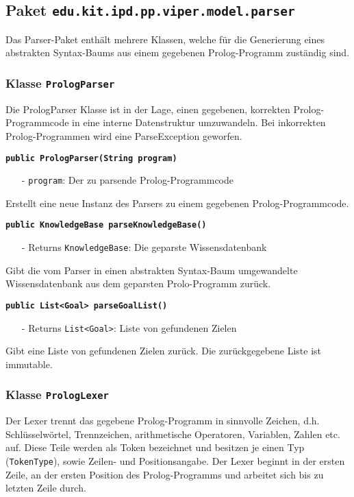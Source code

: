 \documentclass[parskip=full,11pt,twoside]{scrartcl}
\begin{document}
\newpage
\subsection{Paket \texttt{edu.kit.ipd.pp.viper.model.parser}}

Das Parser-Paket enthält mehrere Klassen, welche für die Generierung eines abstrakten Syntax-Baums aus einem gegebenen Prolog-Programm zuständig sind.

\subsubsection{Klasse \texttt{PrologParser}}

Die PrologParser Klasse ist in der Lage, einen gegebenen, korrekten Prolog-Programmcode in eine interne Datenstruktur umzuwandeln. Bei inkorrekten Prolog-Programmen wird eine ParseException geworfen.

\textbf{\texttt{public PrologParser(String program)}}
\begin{itemize}[noitemsep]
	\item[-] \texttt{program}: Der zu parsende Prolog-Programmcode
\end{itemize}
Erstellt eine neue Instanz des Parsers zu einem gegebenen Prolog-Programmcode.

\textbf{\texttt{public KnowledgeBase parseKnowledgeBase()}}
\begin{itemize}[noitemsep]
	\item[-] Returns \texttt{KnowledgeBase}: Die geparste Wissensdatenbank
\end{itemize}
Gibt die vom Parser in einen abstrakten Syntax-Baum umgewandelte Wissensdatenbank aus dem geparsten Prolo-Programm zurück.

\textbf{\texttt{public List<Goal> parseGoalList()}}
\begin{itemize}[noitemsep]
	\item[-] Returns \texttt{List<Goal>}: Liste von gefundenen Zielen
\end{itemize}
Gibt eine Liste von gefundenen Zielen zurück. Die zurückgegebene Liste ist immutable.

\subsubsection{Klasse \texttt{PrologLexer}}

Der Lexer trennt das gegebene Prolog-Programm in sinnvolle Zeichen, d.h. Schlüsselwörtel, Trennzeichen, arithmetische Operatoren, Variablen, Zahlen etc. auf. Diese Teile werden als Token bezeichnet und besitzen je einen Typ (\texttt{TokenType}), sowie Zeilen- und Positionsangabe. Der Lexer beginnt in der ersten Zeile, an der ersten Position des Prolog-Programms und arbeitet sich bis zu letzten Zeile durch.
\end{document}
